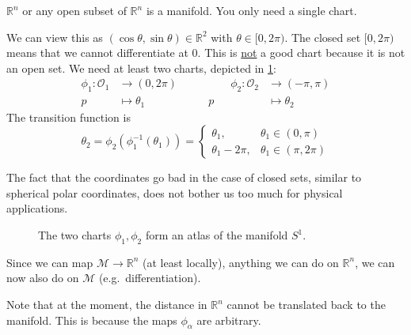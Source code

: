 \begin{example}[$\mathbb{R}^n$]
  $\mathbb{R}^n$ or any open subset of $\mathbb{R}^n$ is a manifold. You only need a single chart.
\end{example}

\begin{example}[$S^1$]
  We can view this as $(\cos \theta, \sin \theta) \in \mathbb{R}^{2}$ with $\theta \in [0, 2\pi)$. The closed set $[0, 2\pi)$ means that we cannot differentiate at $0$. This is \underline{not} a good chart because it is not an open set. 
  We need at least two charts, depicted in \ref{fig:L1F2}:
  \begin{equation}
    \begin{alignedat}{2}
      \phi_1 \colon \mathcal{O}_1 &\to (0, 2\pi)  \qquad&\qquad
      \phi_2 \colon \mathcal{O}_2 &\to (-\pi, \pi) \\
      p &\mapsto \theta_1 &
      p &\mapsto \theta_2
    \end{alignedat}
  \end{equation}
  The transition function is 
  \begin{equation}
    \theta_2 = \phi_2(\phi_1^{-1}(\theta_1)) = 
    \begin{cases}
      \theta_1, & \theta_1 \in (0, \pi) \\
      \theta_1 - 2\pi, & \theta_1 \in (\pi, 2\pi)
    \end{cases}
  \end{equation}
\begin{leftbar}
  \begin{remark}
    The fact that the coordinates go bad in the case of closed sets, similar to spherical polar coordinates, does not bother us too much for physical applications.
  \end{remark}
\end{leftbar}
\end{example}
\begin{figure}[htpb]
  \centering
  \def\svgwidth{0.7\columnwidth}
  
  \caption{The two charts $\phi_1, \phi_2$ form an atlas of the manifold $S^1$.}
  \label{fig:L1F2}
\end{figure}

Since we can map $\mathcal{M} \to \mathbb{R}^n$ (at least locally), anything we can do on $\mathbb{R}^n$, we can now also do on $\mathcal{M}$ (e.g.~differentiation).

\begin{leftbar}
  \begin{remark}
    Note that at the moment, the distance in $\mathbb{R}^n$ cannot be translated back to the manifold. This is because the maps $\phi_\alpha$ are arbitrary.
  \end{remark}
\end{leftbar}

